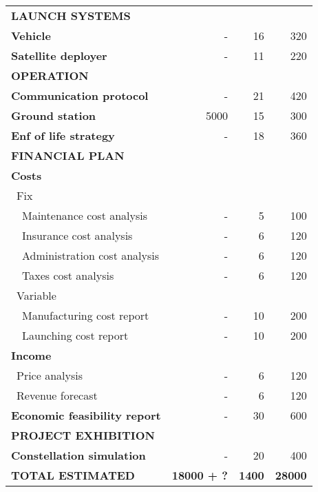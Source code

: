 \begin{longtable}{| l | r | r |r | }
\rowcolor[gray]{0.85} \textbf{LAUNCH SYSTEMS} & &  &   \\
	
	\textbf{Vehicle} & - & 16 & 320 \\
	\hline
	\textbf{Satellite deployer} & - & 11 & 220  \\

	
\rowcolor[gray]{0.85} \textbf{OPERATION} & &  &  \\
	
	\textbf{Communication protocol} & - & 21 & 420 \\
	\hline
	\textbf{Ground station} & 5000 & 15 & 300 \\
	\hline
	\textbf{Enf of life strategy} & - & 18  & 360 \\
	\hline

\pagebreak

	\hline
\rowcolor[gray]{0.85} \textbf{FINANCIAL PLAN} & &  & \\
	
	\textbf{Costs} & & & \\
	   \blue ~Fix & &  &   \\
	   ~~Maintenance cost analysis & - & 5 & 100 \\
	   ~~Insurance cost analysis & - & 6 & 120 \\
	   ~~Administration cost analysis & - & 6 & 120 \\
	   ~~Taxes cost analysis & - & 6 & 120 \\
	   \blue ~Variable & &  & \\
	   ~~Manufacturing cost report & - & 10 & 200 \\
	   ~~Launching cost report & - & 10 & 200 \\
	\hline
	\textbf{Income} & & &  \\
	   \blue ~Price analysis & - & 6  & 120  \\
	   \blue ~Revenue forecast & - & 6  & 120  \\
	\hline
	\textbf{Economic feasibility report} & - & 30 & 600 \\

\rowcolor[gray]{0.85} \textbf{PROJECT EXHIBITION} & & &  \\

	\textbf{Constellation simulation} & - & 20 & 400 \\

\rowcolor[gray]{0.65} \textbf{TOTAL ESTIMATED} & \textbf{18000 + ?} & \textbf{1400} & \textbf{28000} \\
    \hline

\end{longtable}